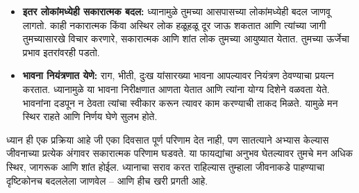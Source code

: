 \begin{itemize}
\item
 \textbf{इतर लोकांमध्येही सकारात्मक बदल:}
 ध्यानामुळे तुमच्या आसपासच्या लोकांमध्येही बदल जाणवू लागतो. काही नकारात्मक किंवा अस्थिर लोक हळूहळू दूर जाऊ शकतात आणि त्यांच्या जागी तुमच्यासारखे विचार करणारे, सकारात्मक आणि शांत लोक तुमच्या आयुष्यात येतात. तुमच्या ऊर्जेचा प्रभाव इतरांवरही पडतो.
\item
 \textbf{भावना नियंत्रणात येणे:}
 राग, भीती, दुःख यांसारख्या भावना आपल्यावर नियंत्रण ठेवण्याचा प्रयत्न करतात. ध्यानामुळे या भावना निरीक्षणात आणता येतात आणि त्यांना योग्य दिशेने वळवता येते. भावनांना दडपून न ठेवता त्यांचा स्वीकार करून त्यावर काम करण्याची ताकद मिळते. यामुळे मन स्थिर राहते आणि निर्णय घेणे सुलभ होते.
\end{itemize}
ध्यान ही एक प्रक्रिया आहे जी एका दिवसात पूर्ण परिणाम देत नाही, पण सातत्याने अभ्यास केल्यास जीवनाच्या प्रत्येक अंगावर सकारात्मक परिणाम घडवते. या फायद्यांचा अनुभव घेतल्यावर तुमचे मन अधिक स्थिर, जागरूक आणि शांत होईल. ध्यानाचा सराव करत राहिल्यास तुम्हाला जीवनाकडे पाहण्याचा दृष्टिकोनच बदललेला जाणवेल – आणि हीच खरी प्रगती आहे.

